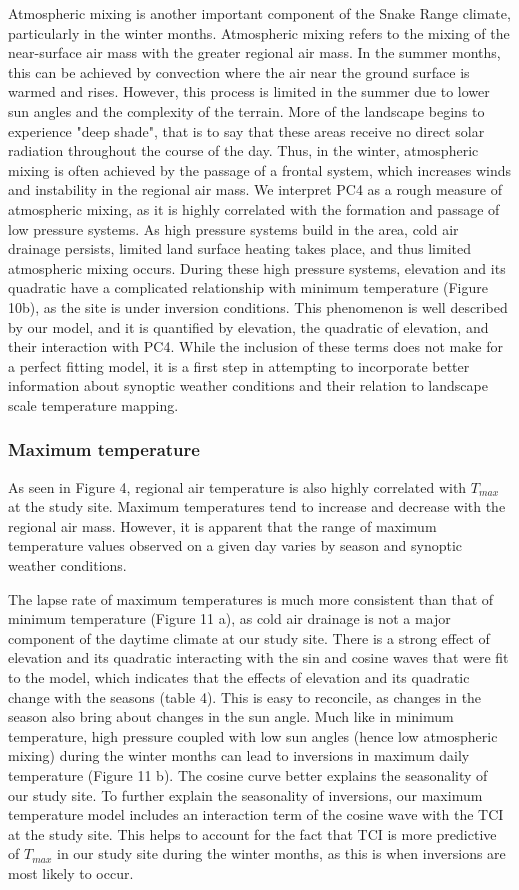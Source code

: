 \documentclass{ametsoc}
\begin{document}
Atmospheric mixing is another important component of the Snake Range climate,
particularly in the winter months. Atmospheric mixing refers to the mixing of
the near-surface air mass with the greater regional air mass. In the summer
months, this can be achieved by convection where the air near the ground surface
is warmed and rises. However, this process is limited in the summer due to lower
sun angles and the complexity of the terrain. More of the landscape begins to
experience "deep shade", that is to say that these areas receive no direct solar
radiation throughout the course of the day. Thus, in the winter, atmospheric
mixing is often achieved by the passage of a frontal system, which increases
winds and instability in the regional air mass. We interpret PC4 as a rough
measure of atmospheric mixing, as it is highly correlated with the formation and
passage of low pressure systems. As high pressure systems build in the area,
cold air drainage persists, limited land surface heating takes place, and thus
limited atmospheric mixing occurs. During these high pressure systems, elevation
and its quadratic have a complicated relationship with minimum temperature
(Figure 10b), as the site is under inversion conditions. This phenomenon is well
described by our model, and it is quantified by elevation, the quadratic of
elevation, and their interaction with PC4. While the inclusion of these terms
does not make for a perfect fitting model, it is a first step in attempting to
incorporate better information about synoptic weather conditions and their
relation to landscape scale temperature mapping.

\subsubsection{Maximum temperature}
As seen in Figure 4, regional air temperature is also highly correlated with
$T_{max}$ at the study site. Maximum temperatures tend to increase and decrease
with the regional air mass. However, it is apparent that the range of maximum
temperature values observed on a given day varies by season and synoptic weather
conditions.

The lapse rate of maximum temperatures is much more consistent than that of
minimum temperature (Figure 11 a), as cold air drainage is not a major component
of the daytime climate at our study site. There is a strong effect of elevation
and its quadratic interacting with the sin and cosine waves that were fit to the
model, which indicates that the effects of elevation and its quadratic change
with the seasons (table 4). This is easy to reconcile, as changes in the season
also bring about changes in the sun angle. Much like in minimum temperature,
high pressure coupled with low sun angles (hence low atmospheric mixing) during
the winter months can lead to inversions in maximum daily temperature (Figure 11
b). The cosine curve better explains the seasonality of our study site. To
further explain the seasonality of inversions, our maximum temperature model
includes an interaction term of the cosine wave with the TCI at the study site.
This helps to account for the fact that TCI is more predictive of $T_{max}$ in
our study site during the winter months, as this is when inversions are most
likely to occur.
\end{document}
